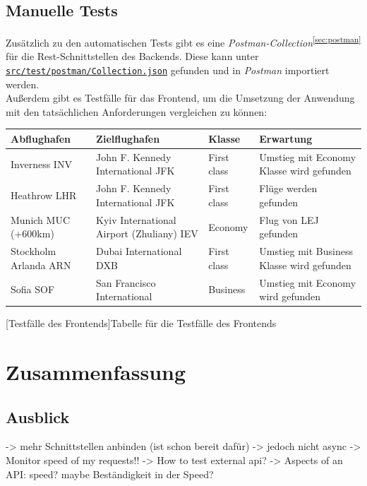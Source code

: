 \documentclass[12pt,twoside,a4paper]{article}
\begin{document}
\subsection{Manuelle Tests}
Zusätzlich zu den automatischen Tests gibt es eine \textit{Postman-Collection}\textsuperscript{\ref{sec:postman}} für die Rest-Schnittstellen des Backends. Diese kann unter \href{https://github.com/featherkraken/featherkraken/blob/master/src/test/postman/Collection.json}{\texttt{src/test/postman/Collection.json}} gefunden und in \textit{Postman} importiert werden.\\
Außerdem gibt es Testfälle für das Frontend, um die Umsetzung der Anwendung mit den tatsächlichen Anforderungen vergleichen zu können:
\begin{center}
	\captionsetup{type=figure}
	\resizebox{\textwidth}{!}
	{\begin{tabular}{ l | l | l | l }
			\textbf{Abflughafen} & \textbf{Zielflughafen} & \textbf{Klasse} & \textbf{Erwartung} \\
			\hline
			Inverness INV & John F. Kennedy International JFK & First class &  Umstieg mit Economy Klasse wird gefunden\\
			\hline
			Heathrow LHR & John F. Kennedy International JFK & First class &  Flüge werden gefunden\\
			\hline
			Munich MUC (+600km) & Kyiv International Airport (Zhuliany) IEV & Economy &  Flug von LEJ gefunden\\
			\hline
			Stockholm Arlanda ARN & Dubai International DXB & First class &  Umstieg mit Business Klasse wird gefunden\\
			\hline
			Sofia SOF & San Francisco International & Business &  Umstieg mit Economy wird gefunden\\
	\end{tabular}}
	[Testfälle des Frontends]{Tabelle für die Testfälle des Frontends}
	\label{fig:ui-tests}
\end{center}
\section{Zusammenfassung}
\subsection{Ausblick}
-> mehr Schnittstellen anbinden (ist schon bereit dafür)
-> jedoch nicht async
-> Monitor speed of my requests!!
-> How to test external api?
-> Aspects of an API: speed? maybe Beständigkeit in der Speed?
\newpage


\end{document}

